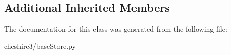 \subsection*{Additional Inherited Members}


The documentation for this class was generated from the following file\-:\begin{DoxyCompactItemize}
\item 
cheshire3/base\-Store.\-py\end{DoxyCompactItemize}

